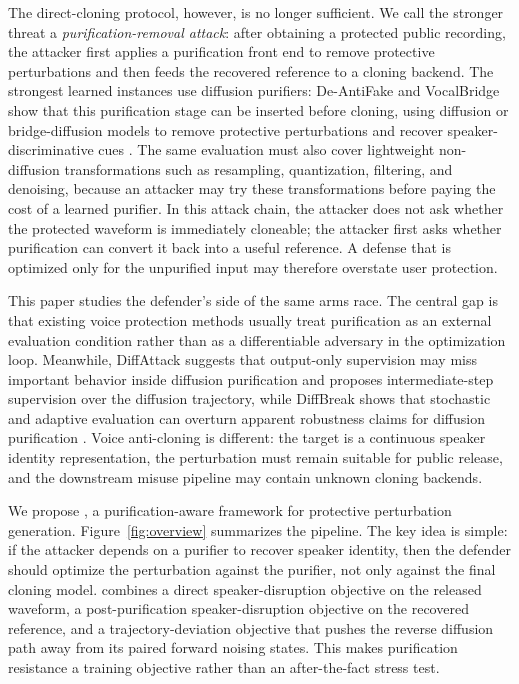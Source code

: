 The direct-cloning protocol, however, is no longer sufficient. 
We call the stronger threat a \emph{purification-removal attack}: after obtaining a protected public recording, the attacker first applies a purification front end to remove protective perturbations and then feeds the recovered reference to a cloning backend. 
The strongest learned instances use diffusion purifiers: De-AntiFake and VocalBridge show that this purification stage can be inserted before cloning, 
using diffusion or bridge-diffusion models to remove protective perturbations and recover speaker-discriminative cues \cite{fan2025deantifake,abbasihafshejani2026vocalbridge}. 
The same evaluation must also cover lightweight non-diffusion transformations such as resampling, quantization, filtering, and denoising, because an attacker may try these transformations before paying the cost of a learned purifier.
In this attack chain, the attacker does not ask whether the protected waveform is immediately cloneable; the attacker first asks whether purification can convert it back into a useful reference. 
A defense that is optimized only for the unpurified input may therefore overstate user protection.

This paper studies the defender's side of the same arms race. The central gap is that existing voice protection methods usually treat purification as an external evaluation condition rather than as a differentiable adversary in the optimization loop. 
Meanwhile, DiffAttack suggests that output-only supervision may miss important behavior inside diffusion purification and proposes intermediate-step supervision over the diffusion trajectory, 
while DiffBreak shows that stochastic and adaptive evaluation can overturn apparent robustness claims for diffusion purification \cite{kang2023diffattack,kassis2025diffbreak}. 
Voice anti-cloning is different: the target is a continuous speaker identity representation, the perturbation must remain suitable for public release, and the downstream misuse pipeline may contain unknown cloning backends.

We propose \method, a purification-aware framework for protective perturbation generation. Figure~\ref{fig:overview} summarizes the pipeline.
The key idea is simple: if the attacker depends on a purifier to recover speaker identity, 
then the defender should optimize the perturbation against the purifier, not only against the final cloning model. 
\method{} combines a direct speaker-disruption objective on the released waveform, a post-purification speaker-disruption objective on the recovered reference, 
and a trajectory-deviation objective that pushes the reverse diffusion path away from its paired forward noising states. 
This makes purification resistance a training objective rather than an after-the-fact stress test.

